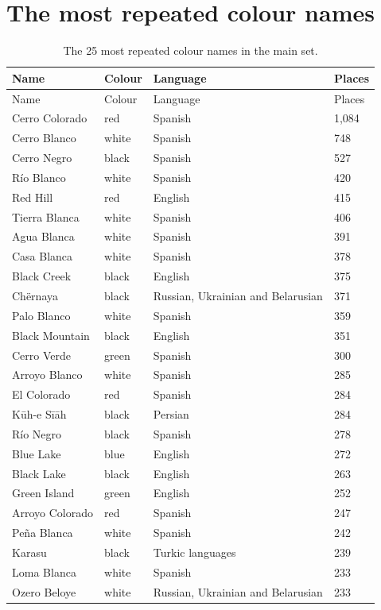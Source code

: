 \documentclass[11pt,a4paper]{article}
\begin{document}
\section{The most repeated colour names}
{\footnotesize\begin{longtable}{llll}\caption{The 25 most repeated colour names in the main set.}\label{tab:top}\\\toprule Name & Colour & Language & Places\\\midrule\endfirsthead\toprule Name & Colour & Language & Places\\\midrule\endhead
Cerro Colorado & red & Spanish & 1,084\\
Cerro Blanco & white & Spanish & 748\\
Cerro Negro & black & Spanish & 527\\
Río Blanco & white & Spanish & 420\\
Red Hill & red & English & 415\\
Tierra Blanca & white & Spanish & 406\\
Agua Blanca & white & Spanish & 391\\
Casa Blanca & white & Spanish & 378\\
Black Creek & black & English & 375\\
Chërnaya & black & Russian, Ukrainian and Belarusian & 371\\
Palo Blanco & white & Spanish & 359\\
Black Mountain & black & English & 351\\
Cerro Verde & green & Spanish & 300\\
Arroyo Blanco & white & Spanish & 285\\
El Colorado & red & Spanish & 284\\
Kūh-e Sīāh & black & Persian & 284\\
Río Negro & black & Spanish & 278\\
Blue Lake & blue & English & 272\\
Black Lake & black & English & 263\\
Green Island & green & English & 252\\
Arroyo Colorado & red & Spanish & 247\\
Peña Blanca & white & Spanish & 242\\
Karasu & black & Turkic languages & 239\\
Loma Blanca & white & Spanish & 233\\
Ozero Beloye & white & Russian, Ukrainian and Belarusian & 233\\
\bottomrule\end{longtable}}
\end{document}
